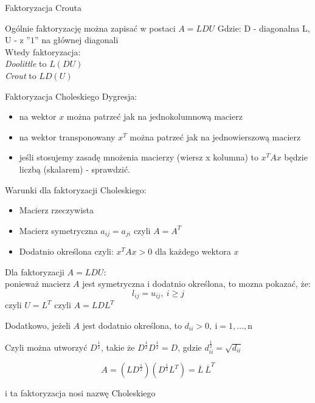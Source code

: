 \begin{frame}{Faktoryzacja Crouta}
\begin{exampleblock}{Ogólnie faktoryzację można zapisać w  postaci $A=LDU$}
Gdzie:
D - diagonalna \hspace{40mm } 
\newline
 L, U - z ''$1$'' na głównej diagonali\\ 
 \vspace{0.5cm}
 Wtedy faktoryzacja:\\
 {\it Doolittle} to  $L(DU)$\\
 {\it Crout} to   $LD(U)$
\newline 
\end{exampleblock}
\end{frame}
\begin{frame}{Faktoryzacja Choleskiego}
Dygresja:
\begin{itemize}
    \item na wektor $x$ można patrzeć jak na jednokolumnową macierz
    \item na wektor transponowany $x^T$ można patrzeć jak na jednowierszową macierz
    \item jeśli stosujemy zasadę mnożenia macierzy (wiersz x kolumna) to $x^T A x$ będzie liczbą (skalarem) - sprawdzić. 
\end{itemize}
Warunki dla faktoryzacji Choleskiego:
\begin{itemize}
    \item Macierz rzeczywista
\item Macierz symetryczna $a_{ij}=a_{ji}$  czyli $A=A^{T}$
\item Dodatnio określona czyli: $x^T A x > 0$ dla każdego wektora $x$
\end{itemize}
\end{frame}
\begin{frame}
  Dla faktoryzacji $A=LDU$:\\

ponieważ macierz $A$ jest symetryczna i dodatnio określona, to mozna pokazać, że:
$$
l_{ij}=u_{ij},\ i\geq j
$$
czyli $U=L^T$ czyli $A=LDL^{T}$

Dodatkowo, jeżeli $A$ jest dodatnio określona, to $d_{ii}>0, \ \mathrm{i}=1,\ldots,\mathrm{n}$

Czyli można utworzyć $D^{\frac{1}{2}}$, takie że
$D^{\frac{1}{2}}D^{\frac{1}{2}}=D$, gdzie $d^{\frac{1}{2}}_{ii}=\sqrt{d_{ii}}$

\begin{exampleblock}{}
$$
A=(LD^{\frac{1}{2}})(D^{\frac{1}{2}}L^{T})=\overline{L}\ \overline{L}^{T}
$$
\end{exampleblock}
i ta faktoryzacja nosi nazwę Choleskiego

\end{frame}
